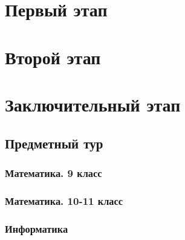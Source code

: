 \documentclass[a4paper,12pt,oneside]{book}
\begin{document}

\setcounter{tocdepth}{1}

\tableofcontents

\part{Первый этап}




\part{Второй этап}



\part{Заключительный этап}

\clearpage
\chapter{Предметный тур}

\section{Математика. 9 класс}


\section{Математика. 10-11 класс}


\section{Информатика}

\end{document}
